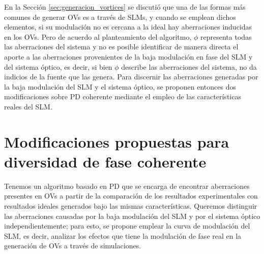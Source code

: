 En la Sección \ref{sec:generacion_vortices} se discutió que una de las formas más comunes de generar OVs es a través de SLMs, y cuando se emplean dichos elementos, si su modulación no es cercana a la ideal hay aberraciones inducidas en los OVs. Pero de acuerdo al planteamiento del algoritmo, $\phi$ representa todas las aberraciones del sistema y no es posible identificar de manera directa el aporte a las aberraciones provenientes de la baja modulación en fase del SLM y del sistema óptico, es decir, si bien $\phi$ describe las aberraciones del sistema, no da indicios de la fuente que las genera. Para discernir las aberraciones generadas por la baja modulación del SLM y el sistema óptico, se proponen entonces dos modificaciones sobre PD coherente mediante el empleo de las características reales del SLM.

\section{Modificaciones propuestas para diversidad de fase coherente}
\label{sec:pd12}

Tenemos un algoritmo basado en PD que se encarga de encontrar aberraciones presentes en OVs a partir de la comparación de los resultados experimentales con resultados ideales generados bajo las mismas características. Queremos distinguir las aberraciones causadas por la baja modulación del SLM y por el sistema óptico independientemente; para esto, se propone emplear la curva de modulación del SLM, es decir, analizar los efectos que tiene la modulación de fase real en la generación de OVs a través de simulaciones.\\



